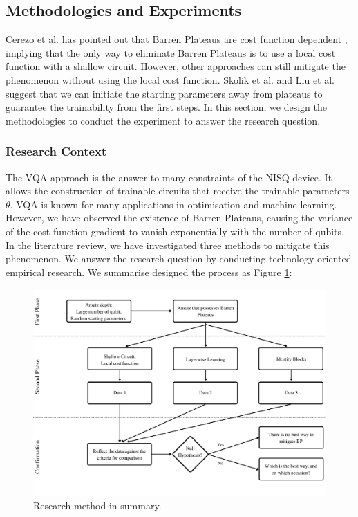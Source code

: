 \subsection{Methodologies and Experiments}
Cerezo et al. has pointed out that Barren Plateaus are cost function dependent \cite{cerezoCostFunctionDependent2021}, implying that the only way to eliminate Barren Plateaus is to use a local cost function with a shallow circuit.
However, other approaches can still mitigate the phenomenon without using the local cost function.
Skolik et al. and Liu et al. \cite{skolikLayerwiseLearningQuantum2021, liuParameterInitializationMethod2021} suggest that we can initiate the starting parameters away from plateaus to guarantee the trainability from the first steps.
In this section, we design the methodologies to conduct the experiment to answer the research question.

\subsubsection{Research Context}
The VQA approach is the answer to many constraints of the NISQ device. It allows the construction of trainable circuits that receive the trainable parameters $\theta$.
VQA is known for many applications in optimisation and machine learning.
However, we have observed the existence of Barren Plateaus, causing the variance of the cost function gradient to vanish exponentially with the number of qubits.
In the literature review, we have investigated three methods \cite{cerezoCostFunctionDependent2021, liuParameterInitializationMethod2021, skolikLayerwiseLearningQuantum2021} to mitigate this phenomenon.
We answer the research question by conducting technology-oriented empirical research.
We summarise designed the process as Figure \ref{Research Activities}:

\begin{figure}
    \centering
    \includegraphics[width=\textwidth]{./ResearchDesign/Appendices/Method.png}
    \caption{
        Research method in summary.
    }
    \label{Research Activities}
\end{figure}

